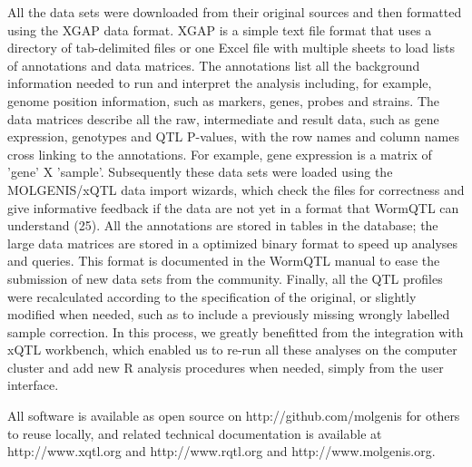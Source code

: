 \documentclass[8pt, twoside, a5paper]{report}
\begin{document}
All the data sets were downloaded from their original sources and then formatted using the XGAP data format. XGAP is a simple 
text file format that uses a directory of tab-delimited files or one Excel file with multiple sheets to load lists of annotations 
and data matrices. The annotations list all the background information needed to run and interpret the analysis including, 
for example, genome position information, such as markers, genes, probes and strains. The data matrices describe all the raw, 
intermediate and result data, such as gene expression, genotypes and QTL P-values, with the row names and column names cross 
linking to the annotations. For example, gene expression is a matrix of 'gene' X 'sample'. Subsequently these data sets were 
loaded using the MOLGENIS/xQTL data import wizards, which check the files for correctness and give informative feedback if the 
data are not yet in a format that WormQTL can understand (25). All the annotations are stored in tables in the database; the 
large data matrices are stored in a optimized binary format to speed up analyses and queries. This format is documented in 
the WormQTL manual to ease the submission of new data sets from the community. Finally, all the QTL profiles were recalculated 
according to the specification of the original, or slightly modified when needed, such as to include a previously missing wrongly 
labelled sample correction. In this process, we greatly benefitted from the integration with xQTL workbench, which enabled us to 
re-run all these analyses on the computer cluster and add new R analysis procedures when needed, simply from the user interface.

All software is available as open source on http://github.com/molgenis for others to reuse locally, and related technical 
documentation is available at http://www.xqtl.org and http://www.rqtl.org and http://www.molgenis.org.
\end{document}
